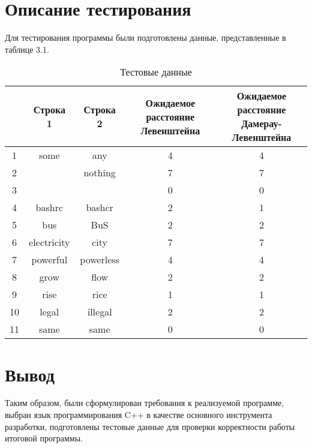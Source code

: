 \section{Описание тестирования}
Для тестирования программы были подготовлены данные, представленные в таблице 3.1.

\begin{table}[H]
    \caption{Тестовые данные}
	\begin{tabular}{|c|c|c|c|c|}
 	\hline
    \No{} & Строка 1 & Строка 2 & \makecell{Ожидаемое расстояние\\Левенштейна} & \makecell{Ожидаемое расстояние\\Дамерау-Левенштейна} \\
 	\hline
 	1 & some & any & 4 & 4\\
 	\hline
 	2 & & nothing & 7 & 7\\
 	\hline
 	3 & & & 0 & 0\\
 	\hline
 	4 & bashrc & bashcr & 2 & 1\\
 	\hline
 	5 & bus & BuS & 2 & 2\\
 	\hline
 	6 & electricity & city & 7 & 7\\
 	\hline
 	7 & powerful & powerless & 4 & 4\\
 	\hline
 	8 & grow & flow & 2 & 2\\
 	\hline
 	9 & rise & rice & 1 & 1\\
 	\hline
    10 & legal & illegal & 2 & 2\\
 	\hline
    11 & same & same & 0 & 0\\
    \hline
	\end{tabular}
\end{table}

\section{Вывод}
Таким образом, были сформулирован требования к реализуемой программе, выбран язык программирования C++ в качестве основного инструмента разработки, подготовлены тестовые данные для проверки корректности работы итоговой программы.

